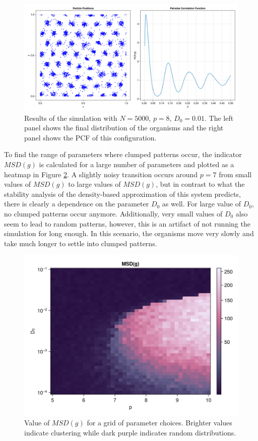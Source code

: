 \documentclass{article}
\begin{document}
\begin{figure}
    \includegraphics[width=0.9\linewidth]{img/rp159_N5000_D01_p8.png}
    \caption{Results of the simulation with $N=5000$, $p=8$, $D_0=0.01$. The left panel shows the final distribution of the organisms and the right panel shows the PCF of this configuration.}
    \label{clumped}
\end{figure}

To find the range of parameters where clumped patterns occur, the indicator $MSD(g)$ is calculated for a large number of parameters and plotted as a heatmap in Figure \ref{heatmap1000}. 
A slightly noisy transition occurs around $p=7$ from small values of $MSD(g)$ to large values of $MSD(g)$, but in contrast to what the stability analysis of the density-based approximation of this system predicts, there is clearly a dependence on the parameter $D_0$ as well. 
For large value of $D_0$, no clumped patterns occur anymore.
Additionally, very small values of $D_0$ also seem to lead to random patterns, however, this is an artifact of not running the simulation for long enough. 
In this scenario, the organisms move very slowly and take much longer to settle into clumped patterns.
\begin{figure}
    \includegraphics[width=0.9\linewidth]{img/hm1.png}
    \caption{Value of $MSD(g)$ for a grid of parameter choices. Brighter values indicate clustering while dark purple indicates random distributions. } 
    \label{heatmap1000}
\end{figure}
\end{document}
